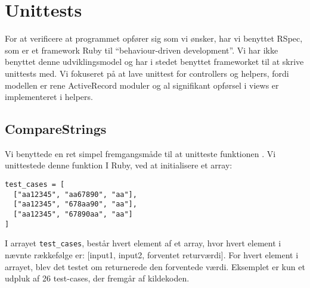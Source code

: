 \section{Unittests}
\label{sec:unittests}
For at verificere at programmet opfører sig som vi ønsker, har vi benyttet RSpec, som er et framework Ruby til ``behaviour-driven development''. Vi har ikke benyttet denne udviklingsmodel og har i stedet benyttet frameworket til at skrive unittests med.
Vi fokuseret på at lave unittest for controllers og helpers, fordi modellen er rene ActiveRecord moduler og al signifikant opførsel i views er implementeret i helpers.

\subsection{CompareStrings}
Vi benyttede en ret simpel fremgangsmåde til at unitteste funktionen . Vi unittestede denne funktion I Ruby, ved at initialisere et array:
\begin{lstlisting}
test_cases = [
  ["aa12345", "aa67890", "aa"],
  ["aa12345", "678aa90", "aa"],
  ["aa12345", "67890aa", "aa"]
]
\end{lstlisting}
I arrayet \texttt{test\_cases}, består hvert element af et array, hvor hvert element i nævnte rækkefølge er: [input1, input2, forventet returværdi].
For hvert element i arrayet, blev det testet om  returnerede den forventede værdi. Eksemplet er kun et udpluk af 26 test-cases, der fremgår af kildekoden.
